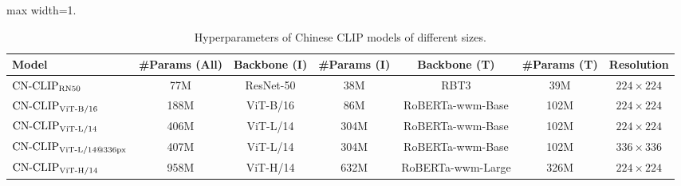 \begin{table}[t]
\center
\small
\vskip 0.15in
\begin{adjustbox}{max width=1.\textwidth}
\begin{tabular}{@{\extracolsep{\fill}}lcccccc}
\toprule
  Model
  & \#Params (All)
  & Backbone (I)
  & \#Params (I)
  & Backbone (T)
  & \#Params (T)
  & Resolution
  \\
\midrule
    $\text{CN-CLIP}\rm_{RN50}$
    & 77M & ResNet-50 & 38M & RBT3 & 39M & $224\times224$
    \\
    $\text{CN-CLIP}\rm_{ViT\text{-}B/16}$
    & 188M & ViT-B/16 & 86M & RoBERTa-wwm-Base & 102M & $224\times224$
    \\
    $\text{CN-CLIP}\rm_{ViT\text{-}L/14}$
    & 406M & ViT-L/14 & 304M & RoBERTa-wwm-Base & 102M & $224\times224$
    \\
    $\text{CN-CLIP}\rm_{ViT\text{-}L/14@336px}$
    & 407M & ViT-L/14 & 304M & RoBERTa-wwm-Base & 102M & $336\times336$
    \\
    $\text{CN-CLIP}\rm_{ViT\text{-}H/14}$
    & 958M & ViT-H/14 & 632M & RoBERTa-wwm-Large & 326M & $224\times224$
    \\
\bottomrule
\end{tabular}
\end{adjustbox}
\caption{Hyperparameters of Chinese CLIP models of different sizes. }
\label{tb:modelcard}
\end{table}